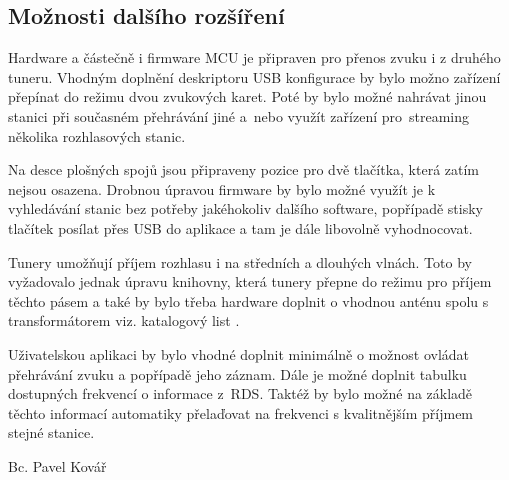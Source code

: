 


\FloatBarrier
\subsection{Možnosti dalšího rozšíření}
Hardware a částečně i firmware MCU je připraven pro přenos zvuku i z druhého tuneru. Vhodným doplnění deskriptoru USB konfigurace by bylo možno zařízení přepínat do režimu dvou zvukových karet. Poté by bylo možné nahrávat jinou stanici při současném přehrávání jiné a~nebo využít zařízení pro~streaming několika rozhlasových stanic.  

Na desce plošných spojů jsou připraveny pozice pro dvě tlačítka, která zatím nejsou osazena. Drobnou úpravou firmware by bylo možné využít je k vyhledávání stanic bez potřeby jakéhokoliv dalšího software, popřípadě stisky tlačítek posílat přes USB do aplikace a tam je dále libovolně vyhodnocovat.

Tunery umožňují příjem rozhlasu i na středních a dlouhých vlnách. Toto by vyžadovalo jednak úpravu knihovny, která tunery přepne do režimu pro příjem těchto pásem a také by bylo třeba hardware doplnit o vhodnou anténu spolu s transformátorem viz. katalogový list \cite{tuner-datasheet}.

Uživatelskou aplikaci by bylo vhodné doplnit minimálně o možnost ovládat přehrávání zvuku a popřípadě jeho záznam. Dále je možné doplnit tabulku dostupných frekvencí o informace z~RDS. Taktéž by bylo možné na základě těchto informací automatiky přelaďovat na frekvenci s kvalitnějším příjmem stejné stanice.





\bigskip
\begin{flushright}
Bc. Pavel Kovář
\end{flushright}